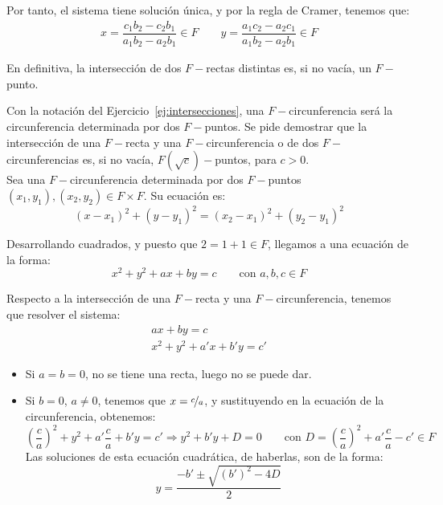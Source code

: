 \begin{ejercicio}
    Por tanto, el sistema tiene solución única, y por la regla de Cramer, tenemos que:
    \begin{align*}
        x = \dfrac{c_1b_2 - c_2b_1}{a_1b_2 - a_2b_1} \in F \qquad 
        y = \dfrac{a_1c_2 - a_2c_1}{a_1b_2 - a_2b_1} \in F
    \end{align*}

    En definitiva, la intersección de dos $F-$rectas distintas es, si no vacía, un $F-$punto.      
\end{ejercicio}

\begin{ejercicio}\label{ej:interseccionesCirc}
    Con la notación del Ejercicio~\ref{ej:intersecciones}, una $F-$circunferencia será la circunferencia determinada por dos $F-$puntos. Se pide demostrar que la intersección de una $F-$recta y una $F-$circunferencia o de dos $F-$circunferencias es, si no vacía, $F(\sqrt{c})-$puntos, para $c>0$.\\
        
    Sea una $F-$circunferencia determinada por dos $F-$puntos $(x_1,y_1),(x_2,y_2)\in F\times F$. Su ecuación es:
    \begin{equation*}
        (x-x_1)^2 + (y-y_1)^2 = (x_2-x_1)^2 + (y_2-y_1)^2
    \end{equation*}

    Desarrollando cuadrados, y puesto que $2=1+1\in F$, llegamos a una ecuación de la forma:
    \begin{equation*}
        x^2 + y^2 + ax + by = c\qquad \text{con } a,b,c\in F
    \end{equation*}

    Respecto a la intersección de una $F-$recta y una $F-$circunferencia, tenemos que resolver el sistema:
    \begin{align*}
        ax + by = c \\
        x^2 + y^2 + a'x + b'y = c'
    \end{align*}

    \begin{itemize}
        \item Si $a=b=0$, no se tiene una recta, luego no se puede dar.
        \item Si $b=0$, $a\neq 0$, tenemos que $x = \nicefrac{c}{a}$, y sustituyendo en la ecuación de la circunferencia, obtenemos:
        \begin{equation*}
            \left(\frac{c}{a}\right)^2 + y^2 + a'\frac{c}{a} + b'y = c' \Longrightarrow y^2 + b'y + D = 0\qquad \text{con } D = \left(\frac{c}{a}\right)^2 + a'\frac{c}{a} - c' \in F
        \end{equation*}
        Las soluciones de esta ecuación cuadrática, de haberlas, son de la forma: $$y = \frac{-b' \pm \sqrt{(b')^2 - 4D}}{2}$$
        

\end{itemize}
\end{ejercicio}
